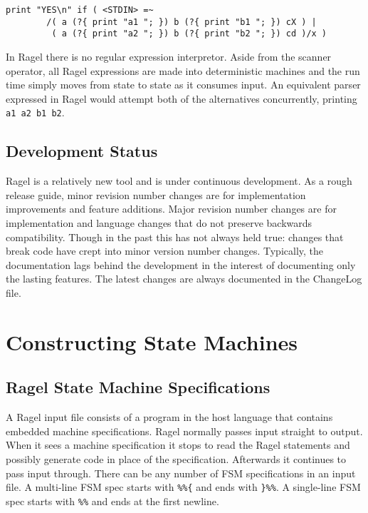 \documentclass[letterpaper,11pt,oneside]{book}
\newcommand{\verbspace}{\vspace{10pt}}
\newenvironment{inline_code}{\def\baselinestretch{1}\vspace{12pt}\small}{}
\begin{document}
\begin{inline_code}
\begin{verbatim}
print "YES\n" if ( <STDIN> =~
        /( a (?{ print "a1 "; }) b (?{ print "b1 "; }) cX ) |
         ( a (?{ print "a2 "; }) b (?{ print "b2 "; }) cd )/x )
\end{verbatim}
\end{inline_code}
\verbspace

In Ragel there is no regular expression interpretor. Aside from the scanner
operator, all Ragel expressions are made into deterministic machines and the
run time simply moves from state to state as it consumes input. An equivalent
parser expressed in Ragel would attempt both of the alternatives concurrently,
printing \verb|a1 a2 b1 b2|.

\section{Development Status}

Ragel is a relatively new tool and is under continuous development. As a rough
release guide, minor revision number changes are for implementation
improvements and feature additions. Major revision number changes are for
implementation and language changes that do not preserve backwards
compatibility. Though in the past this has not always held true: changes that
break code have crept into minor version number changes. Typically, the
documentation lags behind the development in the interest of documenting only
the lasting features. The latest changes are always documented in the ChangeLog
file. 

\chapter{Constructing State Machines}

\section{Ragel State Machine Specifications}

A Ragel input file consists of a program in the host language that contains embedded machine
specifications.  Ragel normally passes input straight to output.  When it sees
a machine specification it stops to read the Ragel statements and possibly generate
code in place of the specification.
Afterwards it continues to pass input through.  There
can be any number of FSM specifications in an input file. A multi-line FSM spec
starts with \verb|%%{| and ends with \verb|}%%|. A single-line FSM spec starts
with \verb|%%| and ends at the first newline.  
\end{document}
